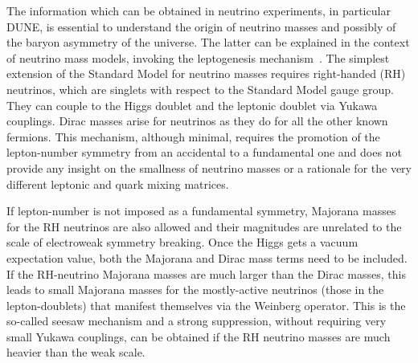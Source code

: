 The information which can be obtained in neutrino experiments, in particular DUNE, is essential to understand the origin of neutrino masses and possibly of the baryon asymmetry of the universe. The latter can be explained in the context of neutrino mass models, invoking the leptogenesis mechanism~\cite{Fukugita:1986hr}. The simplest extension of the Standard Model for neutrino masses requires right-handed (RH) neutrinos, which are singlets with respect to the Standard Model gauge group. They can couple to the Higgs doublet and the leptonic doublet via Yukawa couplings. Dirac masses arise for neutrinos as they do for all the other known fermions. This mechanism, although minimal, requires the promotion of the lepton-number symmetry from an accidental to a fundamental one and does not provide any insight on the smallness of neutrino masses or a rationale for the very different leptonic and quark mixing matrices.


If lepton-number is not imposed as a fundamental symmetry, Majorana masses for the RH neutrinos are also allowed and their magnitudes are unrelated to the scale of electroweak symmetry breaking. Once the Higgs gets a vacuum expectation value, both the Majorana and Dirac mass terms need to be included. If the RH-neutrino Majorana masses are much larger than the Dirac masses, this leads to small Majorana masses for the mostly-active neutrinos (those in the lepton-doublets) that manifest themselves via the Weinberg operator. This is the so-called seesaw mechanism and a strong suppression, without requiring very small Yukawa couplings, can be obtained if the RH neutrino masses are much heavier than the weak scale. 

